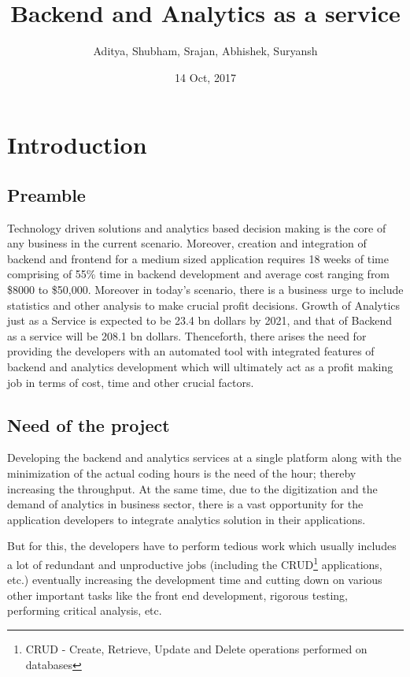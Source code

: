 \documentclass[a4paper,12pt]{report}
\title{Backend and Analytics as a service}
\author{Aditya, Shubham, Srajan, Abhishek, Suryansh}
\date{14 Oct, 2017}
\begin{document}
    
    \setcounter{page}{7}
    \tableofcontents{}    
    \listoffigures
    \listoftables
    
    \newpage
    \setcounter{page}{1}
    \chapter{ Introduction}    
    \section{Preamble}
    \label{sec:introduction}    
    Technology driven solutions and analytics based decision making is the core of any business in the current scenario. Moreover, creation and integration of backend and frontend for a medium sized application requires 18 weeks of time comprising of 55{\%} time\cite{nano4} in backend development and average cost ranging from \$8000 to \$50,000.  Moreover in today’s scenario, there is a business urge to include statistics and other analysis to make crucial profit decisions. Growth of Analytics just as a Service is expected to be  23.4 bn dollars by 2021, and that of Backend as a service will be 208.1 bn dollars. Thenceforth, there arises the need for providing the developers with an automated tool with integrated features of backend and analytics development which will ultimately act as a profit making job in terms of cost, time and other crucial factors.
    \section{Need of the project}
    \label{sec:theory}
    Developing the backend and analytics services at a single platform along with the minimization of the actual coding hours is the need of the hour; thereby increasing the throughput. At the same time, due to the digitization and the demand of analytics in business sector, there is a vast opportunity for the application developers to integrate analytics solution in their applications. 
    
    But for this, the developers have to perform tedious work which usually includes a lot of redundant and unproductive jobs (including the CRUD\footnote{ CRUD - Create, Retrieve, Update and Delete operations performed on databases } applications, etc.)  eventually increasing the development time and cutting down on various other important tasks like the front end development, rigorous testing, performing critical analysis, etc. 
    
\end{document}
